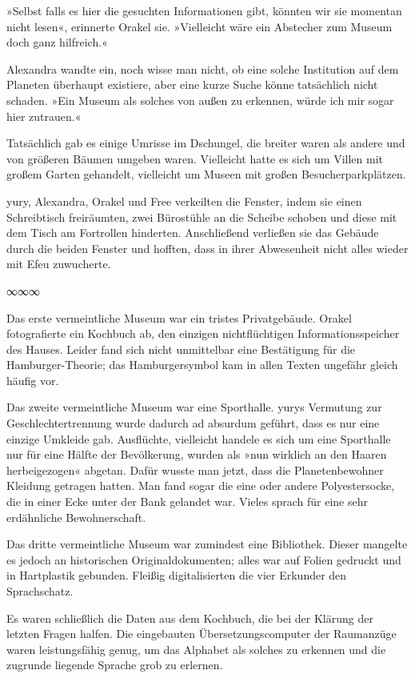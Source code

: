 »Selbst falls es hier die gesuchten Informationen gibt, könnten wir sie momentan nicht lesen«, erinnerte Orakel sie. »Vielleicht wäre ein Abstecher zum Museum doch ganz hilfreich.«

Alexandra wandte ein, noch wisse man nicht, ob eine solche Institution auf dem Planeten überhaupt existiere, aber eine kurze Suche könne tatsächlich nicht schaden. »Ein Museum als solches von außen zu erkennen, würde ich mir sogar hier zutrauen.«

Tatsächlich gab es einige Umrisse im Dschungel, die breiter waren als andere und von größeren Bäumen umgeben waren. Vielleicht hatte es sich um Villen mit großem Garten gehandelt, vielleicht um Museen mit großen Besucherparkplätzen.

yury, Alexandra, Orakel und Free verkeilten die Fenster, indem sie einen Schreibtisch freiräumten, zwei Bürostühle an die Scheibe schoben und diese mit dem Tisch am Fortrollen hinderten. Anschließend verließen sie das Gebäude durch die beiden Fenster und hofften, dass in ihrer Abwesenheit nicht alles wieder mit Efeu zuwucherte.

\begin{center}
∞∞∞
\end{center}

Das erste vermeintliche Museum war ein tristes Privatgebäude. Orakel fotografierte ein Kochbuch ab, den einzigen nichtflüchtigen Informationsspeicher des Hauses. Leider fand sich nicht unmittelbar eine Bestätigung für die Hamburger-Theorie; das Hamburgersymbol kam in allen Texten ungefähr gleich häufig vor.

Das zweite vermeintliche Museum war eine Sporthalle. yurys Vermutung zur Geschlechtertrennung wurde dadurch ad absurdum geführt, dass es nur eine einzige Umkleide gab. Ausflüchte, vielleicht handele es sich um eine Sporthalle nur für eine Hälfte der Bevölkerung, wurden als »nun wirklich an den Haaren herbeigezogen« abgetan. Dafür wusste man jetzt, dass die Planetenbewohner Kleidung getragen hatten. Man fand sogar die eine oder andere Polyestersocke, die in einer Ecke unter der Bank gelandet war. Vieles sprach für eine sehr erdähnliche Bewohnerschaft.

Das dritte vermeintliche Museum war zumindest eine Bibliothek. Dieser mangelte es jedoch an historischen Originaldokumenten; alles war auf Folien gedruckt und in Hartplastik gebunden. Fleißig digitalisierten die vier Erkunder den Sprachschatz.

Es waren schließlich die Daten aus dem Kochbuch, die bei der Klärung der letzten Fragen halfen. Die eingebauten Übersetzungscomputer der Raumanzüge waren leistungsfähig genug, um das Alphabet als solches zu erkennen und die zugrunde liegende Sprache grob zu erlernen.

